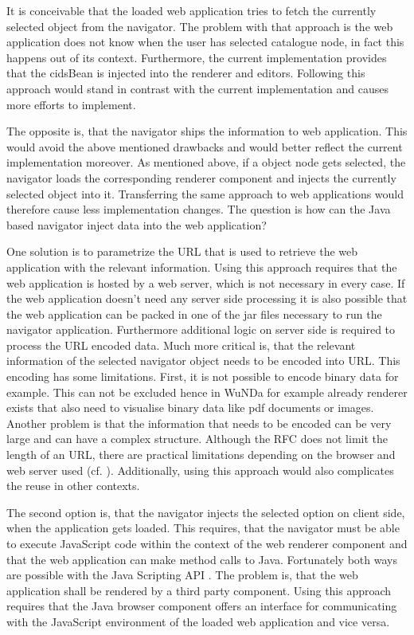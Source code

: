 It is conceivable that the loaded web application tries to fetch the currently selected object from the navigator.
The problem with that approach is  the web application does not know when the user has selected  catalogue node, in fact this happens out of its context. Furthermore, the current implementation provides that the cidsBean is injected into the renderer and editors. Following this approach would stand in contrast with the current implementation and causes more efforts to implement.

The opposite is, that the navigator ships the information to  web application.
This would avoid the above mentioned drawbacks and would better reflect the current implementation moreover.
As mentioned above, if a object node gets selected, the navigator loads the corresponding renderer component and injects the currently selected object into it.
Transferring the same approach to  web applications would therefore cause less implementation changes.
The question is how can the Java based navigator inject data into the web application? 

One solution is to parametrize the URL that is used to retrieve the web application with the relevant information.
Using this approach requires that the web application is hosted by a web server, which is not necessary in every case.
If the web application doesn't need any server side processing it is also possible that the web application can be packed in one of the jar files necessary to run the navigator application.
Furthermore additional logic on  server side is required to process the URL encoded data.
Much more critical is, that the relevant information of the selected navigator object needs to be encoded into URL.
This encoding has some limitations.
First, it is not possible to encode binary data for example.
This can not be excluded hence in WuNDa for example already renderer exists that also need to visualise binary data like pdf documents or images.  
Another problem is that the information that needs to be encoded can be very large and can have a complex structure.
Although the RFC \autocite{conception:rfc-uri}  does not limit the length of an URL, there are practical limitations depending on the browser and web server used (cf. \autocite{conception:uri-length}).
Additionally, using this approach would also complicates the reuse in other contexts.

The second option is, that the navigator injects the selected option on client side, when the application gets loaded.
This requires, that the navigator must be able to execute JavaScript code within the context of the web renderer component and that the web application can make method calls to Java.
Fortunately both ways are possible with the Java Scripting API \autocite{conception:rhino}.
The problem is, that the web application shall be rendered by a third party component.
Using this approach requires that the Java browser component offers an interface for communicating with the JavaScript environment of the loaded web application and vice versa.

